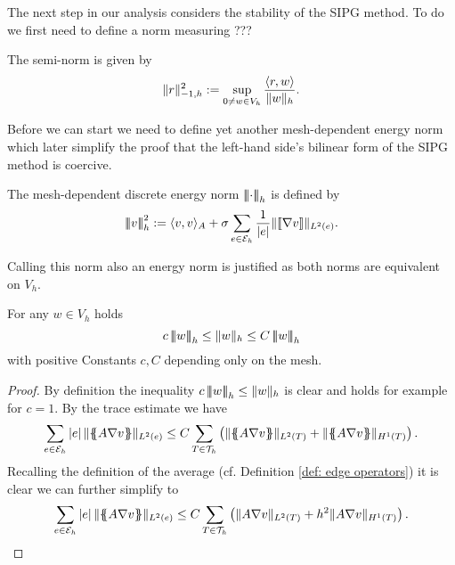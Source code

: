 The next step in our analysis considers the stability of the SIPG method. To do we first need to define a norm measuring ??? 
\begin{definition} \label{def: h-1 seminorm}
	The semi-norm is given by 
	\[
		\lVert r \rVert_{-1,h} ^2 := \sup_{0 \neq w \in V_h} \frac {{ \langle r, w \rangle } } {\lVert w \rVert_{h}}.
	\]
\end{definition}
Before we can start we need to define yet another mesh-dependent energy norm which later simplify the proof that the left-hand side's bilinear form of the SIPG method is coercive.
\begin{definition}\label{def: energy norm2}
The mesh-dependent discrete energy norm $\left| \! \left| \! \left| \cdot \right| \! \right| \! \right|_{h} $ is defined by
\[
		\left| \! \left| \! \left| v \right| \! \right| \! \right|_{h}^2 :=    \langle v, v \rangle _A +  \sigma \sum_{e \in \mathcal{E}_h} \frac 1 {|e|}\lVert \llbracket \nabla v \rrbracket \rVert_{L^2(e)}.
\]
\end{definition}
Calling this norm also an energy norm is justified as both norms are equivalent on $V_h$.
\begin{lemma}
	For any $w \in V_h$ holds
		\[
			c \eNormTwo w \leq \eNorm w \leq C \eNormTwo w
		\]
		with positive Constants $c, C$ depending only on the mesh.
\end{lemma}
\begin{proof}
	By definition the inequality $c \left| \! \left| \! \left| w \right| \! \right| \! \right|_{h} \leq \lVert w \rVert_{h}$ is clear and holds for example for $c=1$. 
By the trace estimate we have
	\begin{align}
		\sum_{e \in \edges} \singleNorm e \LTwonormE{\average{A \nabla v}} 
		\leq C \sum_{T \in \triang} \left( \LTwonormT{\average{A \nabla v}} +\HOnenormT{\average{A \nabla v}}   \right).
	\end{align}
Recalling the definition of the average (cf. Definition \ref{def: edge operators}) it is clear we can further simplify to
		\begin{align}
			\sum_{e \in \mathcal{E}_h} \left| e \right| \lVert \{\!\!\{ A \nabla v \}\!\!\} \rVert_{L^2(e)} 
			\leq C \sum_{T \in \mathcal{T}_h} \left( \lVert A \nabla v \rVert_{L^2(T)} +h^2 \lVert  A \nabla v \rVert_{H^1(T)}   \right).
		\end{align}

\end{proof}


